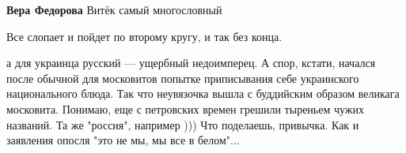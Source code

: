 \begin{itemize}
\begin{itemize}
\textbf{Вера Федорова} Витёк самый многословный
\end{itemize}

 
Все слопает и пойдет по второму кругу, и так без конца.

 

а для украинца русский — ущербный недоимперец. А спор, кстати, начался после
обычной для московитов попытке приписывания себе украинского национального
блюда. Так что неувязочка вышла с буддийским образом великага московита.
Понимаю, еще с петровских времен грешили тыреньем чужих названий. Та же
"россия", например ))) Что поделаешь, привычка. Как и заявления опосля "это не
мы, мы все в белом"...
\end{itemize}

